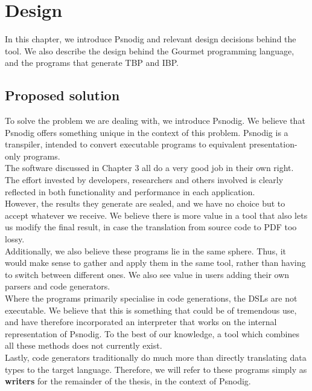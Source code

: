 \chapter{Design}

In this chapter, we introduce Psnodig and relevant design decisions behind the tool. We also describe the design behind the Gourmet programming language, and the programs that generate TBP and IBP.

\section{Proposed solution}

To solve the problem we are dealing with, we introduce Psnodig. We believe that Psnodig offers something unique in the context of this problem. Psnodig is a transpiler, intended to convert executable programs to equivalent presentation-only programs. \hfill \\

The software discussed in Chapter 3 all do a very good job in their own right. The effort invested by developers, researchers and others involved is clearly reflected in both functionality and performance in each application. \hfill \\

However, the results they generate are sealed, and we have no choice but to accept whatever we receive. We believe there is more value in a tool that also lets us modify the final result, in case the translation from source code to PDF too lossy. \hfill \\

Additionally, we also believe these programs lie in the same sphere. Thus, it would make sense to gather and apply them in the same tool, rather than having to switch between different ones. We also see value in users adding their own parsers and code generators. \hfill \\

Where the programs primarily specialise in code generations, the DSLs are not executable. We believe that this is something that could be of tremendous use, and have therefore incorporated an interpreter that works on the internal representation of Psnodig. To the best of our knowledge, a tool which combines all these methods does not currently exist. \hfill \\

Lastly, code generators traditionally do much more than directly translating data types to the target language. Therefore, we will refer to these programs simply as \textbf{writers} for the remainder of the thesis, in the context of Psnodig.

